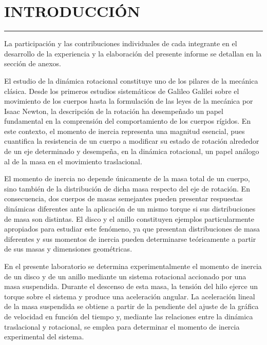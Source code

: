 \documentclass[11pt,a4paper]{article}
\newcommand{\sectionline}{%
    \vspace{-0.6em}
    \noindent\rule{\textwidth}{0.5pt}
    \vspace{0.5em}
}
\begin{document}

\newpage
\tableofcontents
\newpage



\newpage

\section*{INTRODUCCIÓN}
\sectionline

La participación y las contribuciones individuales de cada integrante en el
desarrollo de la experiencia y la elaboración del presente informe se detallan
en la sección de anexos.

El estudio de la dinámica rotacional constituye uno de los pilares de la
mecánica clásica. Desde los primeros estudios sistemáticos de Galileo Galilei
sobre el movimiento de los cuerpos hasta la formulación de las leyes de la
mecánica por Isaac Newton, la descripción de la rotación ha desempeñado un
papel fundamental en la comprensión del comportamiento de los cuerpos rígidos.
En este contexto, el momento de inercia representa una magnitud esencial, pues
cuantifica la resistencia de un cuerpo a modificar su estado de rotación
alrededor de un eje determinado y desempeña, en la dinámica rotacional, un
papel análogo al de la masa en el movimiento traslacional.

El momento de inercia no depende únicamente de la masa total de un cuerpo,
sino también de la distribución de dicha masa respecto del eje de rotación.
En consecuencia, dos cuerpos de masas semejantes pueden presentar respuestas
dinámicas diferentes ante la aplicación de un mismo torque si sus
distribuciones de masa son distintas. El disco y el anillo constituyen ejemplos
particularmente apropiados para estudiar este fenómeno, ya que presentan
distribuciones de masa diferentes y sus momentos de inercia pueden determinarse
teóricamente a partir de sus masas y dimensiones geométricas.

En el presente laboratorio se determina experimentalmente el momento de
inercia de un disco y de un anillo mediante un sistema rotacional accionado
por una masa suspendida. Durante el descenso de esta masa, la tensión del hilo
ejerce un torque sobre el sistema y produce una aceleración angular. La
aceleración lineal de la masa suspendida se obtiene a partir de la pendiente
del ajuste de la gráfica de velocidad en función del tiempo y, mediante las
relaciones entre la dinámica traslacional y rotacional, se emplea para
determinar el momento de inercia experimental del sistema.
\end{document}

